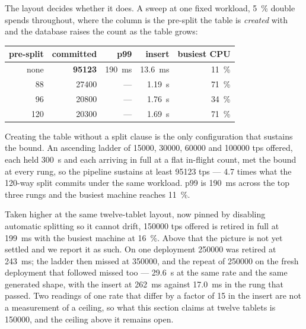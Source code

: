 \documentclass[10pt,twocolumn]{article}
\begin{document}
The layout decides whether it does. A sweep at one fixed workload, \SI{5}{\percent} double spends throughout,
where the column is the pre-split the table is \emph{created} with and the database raises the count as the
table grows:

\begin{center}
\begin{tabular}{rrrrr}
\toprule
pre-split & committed & p99 & insert & busiest CPU \\
\midrule
none & \textbf{\num{95123}} & \SI{190}{\milli\second} & \SI{13.6}{\milli\second} & \SI{11}{\percent} \\
 88 &  \num{27400} & --- & \SI{1.19}{\second} & \SI{71}{\percent} \\
 96 &  \num{20800} & --- & \SI{1.76}{\second} & \SI{34}{\percent} \\
120 &  \num{20300} & --- & \SI{1.69}{\second} & \SI{71}{\percent} \\
\bottomrule
\end{tabular}
\end{center}

Creating the table without a split clause is the only configuration that sustains the bound. An ascending
ladder of \num{15000}, \num{30000}, \num{60000} and \num{100000} tps offered, each held \SI{300}{\second} and
each arriving in full at a flat in-flight count, met the bound at every rung, so the pipeline sustains at
least \num{95123} tps --- \num{4.7} times what the \num{120}-way split commits under the same workload. p99 is
\SI{190}{\milli\second} across the top three rungs and the busiest machine reaches \SI{11}{\percent}.

Taken higher at the same twelve-tablet layout, now pinned by disabling automatic splitting so it cannot
drift, \num{150000} tps offered is retired in full at \SI{199}{\milli\second} with the busiest machine at
\SI{16}{\percent}. Above that the picture is not yet settled and we report it as such. On one deployment
\num{250000} was retired at \SI{243}{\milli\second}; the ladder then missed at \num{350000}, and the
repeat of \num{250000} on the fresh deployment that followed missed too --- \SI{29.6}{\second} at the same
rate and the same generated shape, with the insert at \SI{262}{\milli\second} against
\SI{17.0}{\milli\second} in the rung that passed. Two readings of one rate that differ by a factor of
\num{15} in the insert are not a measurement of a ceiling, so what this section claims at twelve tablets is
\num{150000}, and the ceiling above it remains open.
\end{document}
